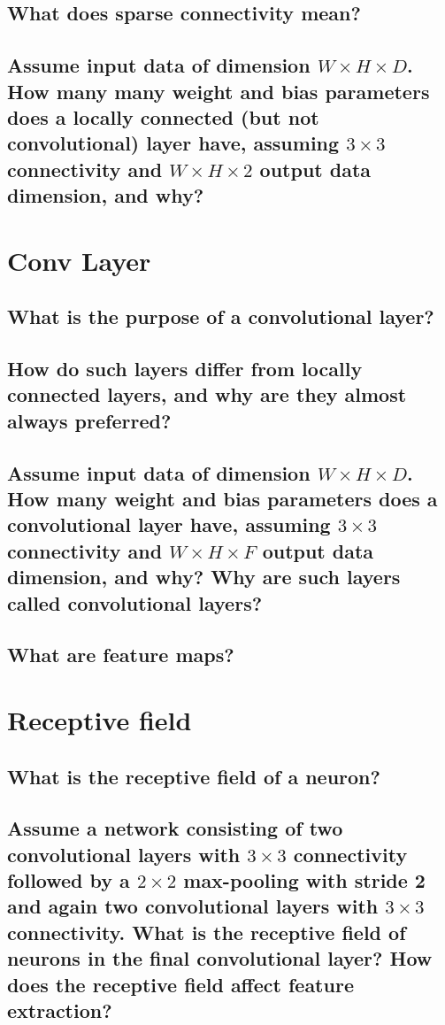 \subsection{What does sparse connectivity mean?}
\subsection{Assume input data of dimension $W \times H \times D$. How many many weight and bias parameters does a locally connected (but not convolutional) layer have, assuming $3 \times 3$ connectivity and $W \times H \times 2$ output data dimension, and why?}

\section{Conv Layer}
\subsection{What is the purpose of a convolutional layer?}
\subsection{How do such layers differ from locally connected layers, and why are they almost always preferred?}
\subsection{Assume input data of dimension $W \times H \times D$. How many weight and bias parameters does a convolutional layer have, assuming $3 \times 3$ connectivity and $W \times H \times  F$ output data dimension, and why? Why are such layers called convolutional layers?}
\subsection{What are feature maps?}

\section{Receptive field}
\subsection{What is the receptive field of a neuron?}
\subsection{Assume a network consisting of two convolutional layers with $3 \times 3$ connectivity followed by a $2 \times 2$ max-pooling with stride 2 and again two convolutional layers with $3 \times 3$ connectivity. What is the receptive field of neurons in the final convolutional layer? How does the receptive field affect feature extraction? }
